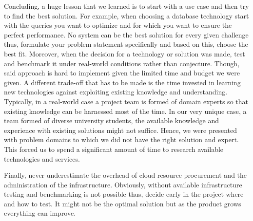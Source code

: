 Concluding, a huge lesson that we learned is to start with a use case and then
try to find the best solution. For example, when choosing a database
technology start with the queries you want to optimize and for which you want
to ensure the perfect performance. No system can be the best solution for every
given challenge thus, formulate your problem statement specifically and based
on this, choose the best fit. Moreover, when the decision for a technology
or solution was made, test and benchmark it under real-world conditions rather
than conjecture. Though, said approach is hard to implement given the limited
time and budget we were given. A different trade-off that has to be made is
the time invested in learning new technologies against exploiting existing
knowledge and understanding. Typically, in a real-world case a project team
is formed of domain experts so that existing knowledge can be harnessed most
of the time. In our very unique case, a team formed of diverse university
students, the available knowledge and experience with existing solutions might
not suffice. Hence, we were presented with problem domains to which we did
not have the right solution and expert. This forced us to spend a significant
amount of time to research available technologies and services.

Finally, never underestimate the overhead of cloud resource procurement and
the administration of the infrastructure. Obviously, without available
infrastructure testing and benchmarking is not possible thus, decide early
in the project where and how to test. It might not be the optimal solution
but as the product grows everything can improve.
